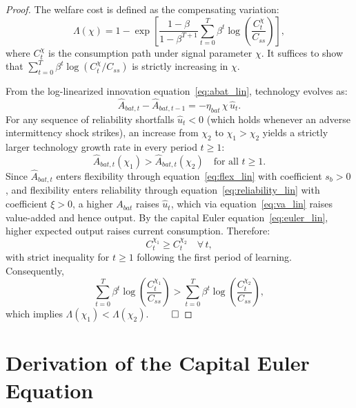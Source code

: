 \documentclass[12pt, a4paper]{article}
\begin{document}
	\begin{proof}
		The welfare cost is defined as the compensating variation:
		\begin{equation*}
			\Lambda(\chi) = 1 - \exp\!\left[\frac{1-\beta}{1-\beta^{T+1}} \sum_{t=0}^{T} \beta^t \log\!\left(\frac{C_t^{\chi}}{C_{ss}}\right)\right],
		\end{equation*}
		where $C_t^{\chi}$ is the consumption path under signal parameter $\chi$. It suffices to show that $\sum_{t=0}^{T}\beta^t \log(C_t^{\chi}/C_{ss})$ is strictly increasing in $\chi$.
		
		From the log-linearized innovation equation~\eqref{eq:abat_lin}, technology evolves as:
		\begin{equation*}
			\hat{A}_{bat,t} - \hat{A}_{bat,t-1} = -\eta_{bat}\,\chi\,\hat{u}_t.
		\end{equation*}
		For any sequence of reliability shortfalls $\hat{u}_t < 0$ (which holds whenever an adverse intermittency shock strikes), an increase from $\chi_2$ to $\chi_1 > \chi_2$ yields a strictly larger technology growth rate in every period $t \geq 1$:
		\begin{equation*}
			\hat{A}_{bat,t}(\chi_1) > \hat{A}_{bat,t}(\chi_2)\quad \text{for all } t \geq 1.
		\end{equation*}
		Since $\hat{A}_{bat,t}$ enters flexibility through equation~\eqref{eq:flex_lin} with coefficient $s_b > 0$, and flexibility enters reliability through equation~\eqref{eq:reliability_lin} with coefficient $\xi > 0$, a higher $A_{bat}$ raises $\hat{u}_t$, which via equation~\eqref{eq:va_lin} raises value-added and hence output. By the capital Euler equation~\eqref{eq:euler_lin}, higher expected output raises current consumption. Therefore:
		\begin{equation*}
			C_t^{\chi_1} \geq C_t^{\chi_2}\quad \forall\, t,
		\end{equation*}
		with strict inequality for $t \geq 1$ following the first period of learning. Consequently,
		\begin{equation*}
			\sum_{t=0}^{T}\beta^t \log\!\left(\frac{C_t^{\chi_1}}{C_{ss}}\right) > \sum_{t=0}^{T}\beta^t \log\!\left(\frac{C_t^{\chi_2}}{C_{ss}}\right),
		\end{equation*}
		which implies $\Lambda(\chi_1) < \Lambda(\chi_2)$. $\qed$
	\end{proof}
	
	
	\section{Derivation of the Capital Euler Equation} \label{app:deriv_euler}
	
\end{document}
